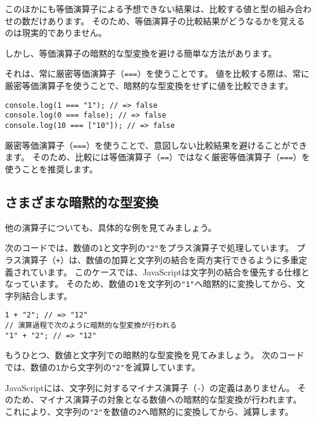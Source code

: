 このほかにも等価演算子による予想できない結果は、比較する値と型の組み合わせの数だけあります。
そのため、等価演算子の比較結果がどうなるかを覚えるのは現実的でありません。

しかし、等価演算子の暗黙的な型変換を避ける簡単な方法があります。

それは、常に厳密等価演算子（\texttt{===}）を使うことです。
値を比較する際は、常に厳密等価演算子を使うことで、暗黙的な型変換をせずに値を比較できます。

\begin{lstlisting}
console.log(1 === "1"); // => false
console.log(0 === false); // => false
console.log(10 === ["10"]); // => false
\end{lstlisting}

厳密等価演算子（\texttt{===}）を使うことで、意図しない比較結果を避けることができます。
そのため、比較には等価演算子（\texttt{==}）ではなく厳密等価演算子（\texttt{===}）を使うことを推奨します。

\hypertarget{various-implicit-coercion}{%
\subsection{さまざまな暗黙的な型変換}\label{various-implicit-coercion}}

他の演算子についても、具体的な例を見てみましょう。

次のコードでは、数値の\texttt{1}と文字列の\texttt{"2"}をプラス演算子で処理しています。
プラス演算子（\texttt{+}）は、数値の加算と文字列の結合を両方実行できるように多重定義されています。
このケースでは、JavaScriptは文字列の結合を優先する仕様となっています。
そのため、数値の\texttt{1}を文字列の\texttt{"1"}へ暗黙的に変換してから、文字列結合します。

\begin{lstlisting}
1 + "2"; // => "12"
// 演算過程で次のように暗黙的な型変換が行われる
"1" + "2"; // => "12"
\end{lstlisting}

もうひとつ、数値と文字列での暗黙的な型変換を見てみましょう。
次のコードでは、数値の\texttt{1}から文字列の\texttt{"2"}を減算しています。

JavaScriptには、文字列に対するマイナス演算子（\texttt{-}）の定義はありません。
そのため、マイナス演算子の対象となる数値への暗黙的な型変換が行われます。
これにより、文字列の\texttt{"2"}を数値の\texttt{2}へ暗黙的に変換してから、減算します。

